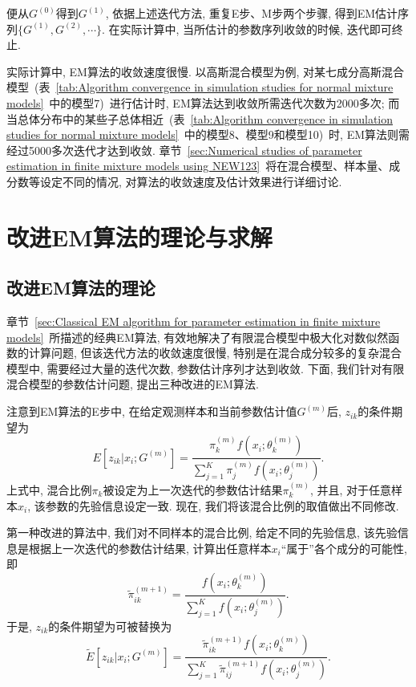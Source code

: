 \documentclass[a4paper,12pt,openany,oneside,utf-8]{ctexbook}
\begin{document}
便从$G^{(0)}$得到$G^{(1)}$, 依据上述迭代方法, 重复E步、M步两个步骤, 得到EM估计序列$\{ G^{(1)}, G^{(2)}, \cdots \}$. 在实际计算中, 当所估计的参数序列收敛的时候, 迭代即可终止.


实际计算中, EM算法的收敛速度很慢. 以高斯混合模型为例, 对某七成分高斯混合模型~(表~\ref{tab:Algorithm convergence in simulation studies for normal mixture models}~中的模型7)~进行估计时, EM算法达到收敛所需迭代次数为2000多次; 而当总体分布中的某些子总体相近~(表~\ref{tab:Algorithm convergence in simulation studies for normal mixture models}~中的模型8、模型9和模型10)~时, EM算法则需经过5000多次迭代才达到收敛. 章节~\ref{sec:Numerical studies of parameter estimation in finite mixture models using NEW123}~将在混合模型、样本量、成分数等设定不同的情况, 对算法的收敛速度及估计效果进行详细讨论.

\section{改进EM算法的理论与求解}
\label{sec:theory and solution to modified EM algorithms}
\subsection{改进EM算法的理论}
章节~\ref{sec:Classical EM algorithm for parameter estimation in finite mixture models}~所描述的经典EM算法, 有效地解决了有限混合模型中极大化对数似然函数的计算问题, 但该迭代方法的收敛速度很慢, 特别是在混合成分较多的复杂混合模型中, 需要经过大量的迭代次数, 参数估计序列才达到收敛. 下面, 我们针对有限混合模型的参数估计问题, 提出三种改进的EM算法.

注意到EM算法的E步中, 在给定观测样本和当前参数估计值$G^{(m)}$后, $z_{ik}$的条件期望为
\begin{equation}
\label{equ:conditional expectation of z_ik in Q function in the m+1 step}
  E[z_{ik}|x_i;G^{(m)}]
  = \frac{ \pi_k^{(m)} f(x_i; \theta_{k}^{(m)}) }{ \sum_{j=1}^{K} \pi_j^{(m)} f(x_i; \theta_{j}^{(m)}) }.
\end{equation}
上式中, 混合比例$\pi_k$被设定为上一次迭代的参数估计结果$\pi_k^{(m)}$, 并且, 对于任意样本$x_i$, 该参数的先验信息设定一致. 现在, 我们将该混合比例的取值做出不同修改.

第一种改进的算法中, 我们对不同样本的混合比例, 给定不同的先验信息, 该先验信息是根据上一次迭代的参数估计结果, 计算出任意样本$x_i$“属于”各个成分的可能性, 即
\begin{equation}
\label{equ:pik_star in new method 1}
  \tilde{\pi}_{ik}^{(m+1)}=\frac{f(x_i;\theta_k^{(m)})}{\sum_{j=1}^{K}f(x_i;\theta_j^{(m)})}.
\end{equation}
于是, $z_{ik}$的条件期望为可被替换为
\begin{equation}
\label{equ:posterior probability for the hidden labels in new method 1}
  \tilde{E}[z_{ik}|x_i;G^{(m)}]
  = \frac{\tilde{\pi}_{ik}^{(m+1)}f(x_{i}; \theta_{k}^{(m)})}{\sum_{j=1}^{K}\tilde{\pi}_{ij}^{(m+1)}f(x_{i}; \theta_{j}^{(m)})}.
\end{equation}
\end{document}
